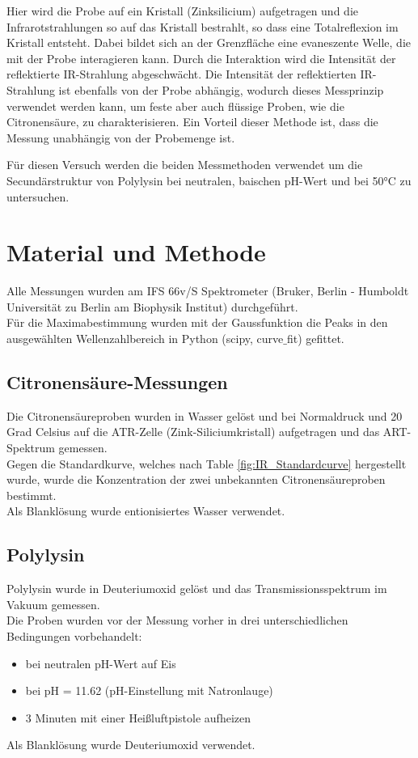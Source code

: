 \documentclass[10pt,a4paper]{article}
\begin{document}
	Hier wird die Probe auf ein Kristall (Zinksilicium) aufgetragen und die Infrarotstrahlungen so auf das Kristall bestrahlt, so dass eine Totalreflexion im Kristall entsteht. Dabei bildet sich an der Grenzfläche eine evaneszente Welle, die mit der Probe interagieren kann. Durch die Interaktion wird die Intensität der reflektierte IR-Strahlung abgeschwächt\cite{ATR_wiki}.
	Die Intensität der reflektierten IR-Strahlung ist ebenfalls von der Probe abhängig, wodurch dieses Messprinzip verwendet werden kann, um feste aber auch flüssige Proben, wie die Citronensäure, zu charakterisieren.
	Ein Vorteil dieser Methode ist, dass die Messung unabhängig von der Probemenge \cite{ATR_MT} ist.
	
	Für diesen Versuch werden die beiden Messmethoden verwendet um die Secundärstruktur von Polylysin bei neutralen, baischen pH-Wert und bei 50°C zu untersuchen.
	
	
	
	
	
	
	
	
	
	
	\section{Material und Methode}
	Alle Messungen wurden am IFS 66v/S Spektrometer (Bruker, Berlin - Humboldt Universität zu Berlin am Biophysik Institut) durchgeführt.\\
	Für die Maximabestimmung wurden mit der Gaussfunktion die Peaks in den ausgewählten Wellenzahlbereich in Python (scipy, curve$\_$fit) gefittet.
	
	\subsection{Citronensäure-Messungen}
	Die Citronensäureproben wurden in Wasser gelöst und bei Normaldruck und 20 Grad Celsius auf die ATR-Zelle (Zink-Siliciumkristall) aufgetragen und das ART-Spektrum gemessen.\\
	Gegen die Standardkurve, welches nach Table \ref{fig:IR_Standardcurve} hergestellt wurde, wurde die Konzentration der zwei unbekannten Citronensäureproben bestimmt.\\
	Als Blanklösung wurde entionisiertes Wasser verwendet.\\
	

	\subsection{Polylysin}
	Polylysin wurde in Deuteriumoxid gelöst und das Transmissionsspektrum im Vakuum gemessen.\\
	Die Proben wurden vor der Messung vorher in drei unterschiedlichen Bedingungen vorbehandelt:
	\begin{itemize}
		\item bei neutralen pH-Wert auf Eis
		\item bei pH = 11.62 (pH-Einstellung mit Natronlauge)
		\item 3 Minuten mit einer Heißluftpistole aufheizen
	\end{itemize}
	Als Blanklösung wurde Deuteriumoxid verwendet.
	
\end{document}
